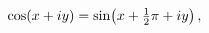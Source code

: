 \[\mathop{\cos\/}\nolimits\!\left(x+iy\right)=\mathop{\sin\/}\nolimits\!\left(x+%
\tfrac{1}{2}\pi+iy\right),\]